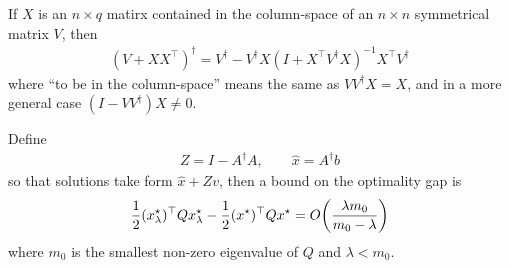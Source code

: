 \documentclass[12pt]{article}
\begin{document}
\begin{theorem}
  \label{thm:kovanic}
  If \(X\) is an \(n \times q\) matirx contained in the column-space
  of an \(n \times n\) symmetrical matrix \(V\), then
  \begin{align*}
    (V + X X^\top)^\dagger
      = V^\dagger
        - V ^\dagger X (I + X^\top V^\dagger X)^{-1} X^\top V^\dagger
  \end{align*}
  where ``to be in the column-space'' means the same as
  \(V V^\dagger X = X\),
  and in a more general case
  \((I - V V^\dagger)X \neq 0\).
\end{theorem}

\begin{theorem}
  Define
  \begin{align*}
    Z = I - A ^\dagger A,
      \qquad \hat{x} = A^\dagger b
  \end{align*}
  so that solutions take form \(\hat{x} + Z v\),
  then a bound on the optimality gap is
  \begin{align*}
    \frac{1}{2} (x_\lambda ^\star)^\top Q x_\lambda ^\star
      - \frac{1}{2} (x^\star)^\top Q x^\star
      = O{\left(\frac{\lambda m_0}{m_0 - \lambda}\right)}
  \end{align*}
  where \(m_0\) is the smallest non-zero eigenvalue of
  \(Q\) and \(\lambda < m_0\).
\end{theorem}
\end{document}
